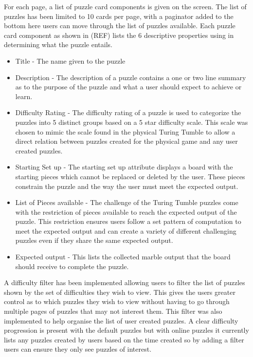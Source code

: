 \documentclass{l4proj}
\begin{document}
For each page, a list of puzzle card components is given on the screen. The list of puzzles has been limited to 10 cards per page, with a paginator added to the bottom  here users can move through the list of puzzles available. Each puzzle card component as shown in (REF) lists the 6 descriptive properties using in determining what the puzzle entails. 
\begin{itemize}
    \item Title - The name given to the puzzle
    \item Description - The description of a puzzle contains a one or two line summary as to the purpose of the puzzle and what a user should expect to achieve or learn.
    \item Difficulty Rating - The difficulty rating of a puzzle is used to categorize the puzzles into 5 distinct groups based on a 5 star difficulty scale. This scale was chosen to mimic the scale found in the physical Turing Tumble to allow a direct relation between puzzles created for the physical game and any user created puzzles.
    \item Starting Set up - The starting set up attribute displays a board with the starting pieces which cannot be replaced or deleted by the user. These pieces constrain the puzzle and the way the user must meet the expected output. 
    \item List of Pieces available - The challenge of the Turing Tumble puzzles come with the restriction of pieces available to reach the expected output of the puzzle. This restriction ensures users follow a set pattern of computation to meet the expected output and can create a variety of different challenging puzzles even if they share the same expected output.
    \item Expected output - This lists the collected marble output that the board should receive to complete the puzzle.
\end{itemize}

A difficulty filter has been implemented allowing users to filter the list of puzzles shown by the set of difficulties they wish to view. This gives the users greater control as to which puzzles they wish to view without having to  go through multiple pages of puzzles that may not interest them. This filter was also implemented to help organise the list of user created puzzles. A clear difficulty progression is present with the default puzzles but with online puzzles it currently lists any puzzles created by users based on the time created so by adding a filter users can ensure they only see puzzles of interest.
\end{document}
